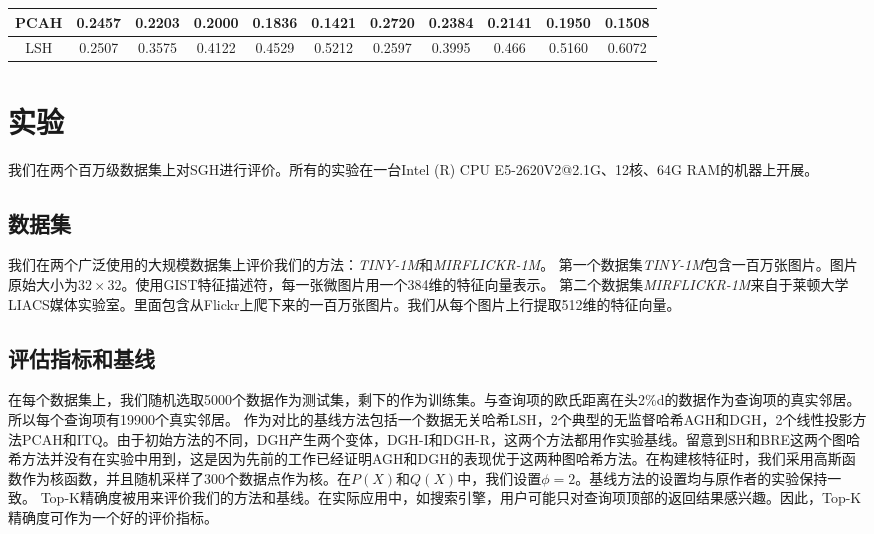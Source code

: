 \message{ !name(SGH.tex)}\documentclass[prodmode,acmtecs]{acmsmall}
\begin{document}
\begin{table}
{\begin{tabular}{|c|c|c|c|c|c|c|c|c|c|c|}
PCAH                    & 0.2457          & 0.2203          & 0.2000          & 0.1836          & 0.1421          & 0.2720          & 0.2384          & 0.2141          & 0.1950          & 0.1508          \\ \hline
LSH                     & 0.2507          & 0.3575          & 0.4122          & 0.4529          & 0.5212          & 0.2597          & 0.3995          & 0.466           & 0.5160          & 0.6072          \\ \hline
\end{tabular}}
\vspace{-2ex}
\end{table}


\section{实验}
我们在两个百万级数据集上对SGH进行评价。所有的实验在一台Intel (R) CPU E5-2620V2@2.1G、12核、64G RAM的机器上开展。


\subsection{数据集}
我们在两个广泛使用的大规模数据集上评价我们的方法：\emph{TINY-1M}\cite{NIPS2014_5332}和\emph{MIRFLICKR-1M}\cite{Huiskes2010New}。
第一个数据集\emph{TINY-1M}包含一百万张图片。图片原始大小为$32\times 32$。使用GIST特征描述符，每一张微图片用一个384维的特征向量表示。
第二个数据集\emph{MIRFLICKR-1M}来自于莱顿大学LIACS媒体实验室。里面包含从Flickr上爬下来的一百万张图片。我们从每个图片上行提取512维的特征向量。

\subsection{评估指标和基线}
在每个数据集上，我们随机选取5000个数据作为测试集，剩下的作为训练集。与查询项的欧氏距离在头2\%d的数据作为查询项的真实邻居。所以每个查询项有19900个真实邻居。
作为对比的基线方法包括一个数据无关哈希LSH\cite{Datar:2004:LHS:997817.997857}，2个典型的无监督哈希AGH\cite{Liu2011Hashing}和DGH\cite{NIPS2014_5332}，2个线性投影方法PCAH\cite{PMID:24136430}和ITQ\cite{PMID:24136430}。由于初始方法的不同，DGH产生两个变体\cite{NIPS2014_5332}，DGH-I和DGH-R，这两个方法都用作实验基线。留意到SH和BRE这两个图哈希方法并没有在实验中用到，这是因为先前的工作已经证明AGH和DGH的表现优于这两种图哈希方法\cite{NIPS2014_5332}。在构建核特征时，我们采用高斯函数作为核函数，并且随机采样了300个数据点作为核。在$P(X)$和$Q(X)$中，我们设置$\phi =2$。基线方法的设置均与原作者的实验保持一致。
Top-K精确度\cite{NIPS2014_5332}被用来评价我们的方法和基线。在实际应用中，如搜索引擎，用户可能只对查询项顶部的返回结果感兴趣。因此，Top-K精确度可作为一个好的评价指标。
\end{document}

